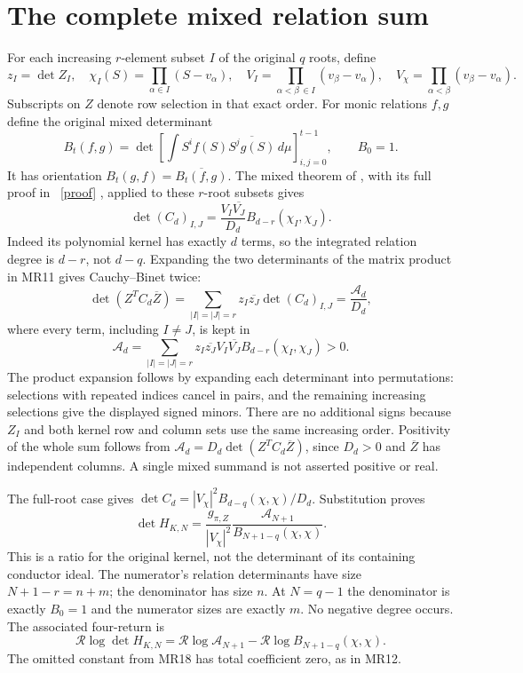 \documentclass[11pt]{article}
\begin{document}
\section{The complete mixed relation sum}
For each increasing $r$-element subset $I$ of the original $q$ roots,
define
\[
 z_I=\det Z_I,\quad
 \chi_I(S)=\prod_{\alpha\in I}(S-v_\alpha),\quad
 V_I=\prod_{\alpha<\beta\,\in I}(v_\beta-v_\alpha),\quad
 V_\chi=\prod_{\alpha<\beta}(v_\beta-v_\alpha).\tag{MR13}
\]
Subscripts on $Z$ denote row selection in that exact order.
For monic relations $f,g$ define the original mixed determinant
\[
 B_t(f,g)=\det\left[\int S^if(S)
                    \overline{S^jg(S)}\,d\mu\right]_{i,j=0}^{t-1},
 \qquad B_0=1.\tag{MR14}
\]
It has orientation $B_t(g,f)=\overline{B_t(f,g)}$.
The mixed theorem of \cite{AV}, with its full proof in \cite{Mixed}%
~\href{https://github.com/KokunoYumeto/zeta-function-research-reader/blob/5992ad50c0f2a06921f1fcaded7b4e38097c0739/workbenches/splitzero-tandem/continuations/20260920-original-kernel-mixed-determinants/MIXED_CONFLUENT_PROOF.tex\#L1}{[proof]}%
{},
applied to these $r$-root subsets gives
\[
 \det(C_d)_{I,J}
  =\frac{V_I\overline{V_J}}{D_d}
           B_{d-r}(\chi_I,\chi_J).\tag{MR15}
\]
Indeed its polynomial kernel has exactly $d$ terms, so the integrated
relation degree is $d-r$, not $d-q$. Expanding the two determinants
of the matrix product in MR11 gives Cauchy--Binet twice:
\[
 \det(Z^TC_d\overline Z)
  =\sum_{|I|=|J|=r}z_I\overline{z_J}\det(C_d)_{I,J}
  =\frac{\mathcal A_d}{D_d},\tag{MR16}
\]
where every term, including $I\ne J$, is kept in
\[
 \mathcal A_d=
 \sum_{|I|=|J|=r}z_I\overline{z_J}V_I\overline{V_J}
                     B_{d-r}(\chi_I,\chi_J)>0.\tag{MR17}
\]
The product expansion follows by expanding each determinant into
permutations: selections with repeated indices cancel in pairs, and
the remaining increasing selections give the displayed signed minors.
There are no additional signs because $Z_I$ and both kernel row and
column sets use the same increasing order.
Positivity of the whole sum follows from
$\mathcal A_d=D_d\det(Z^TC_d\overline Z)$, since $D_d>0$ and
$\overline Z$ has independent columns. A single mixed summand is not
asserted positive or real.

The full-root case gives
$\det C_d=|V_\chi|^2 B_{d-q}(\chi,\chi)/D_d$. Substitution proves
\[
 \boxed{\det H_{K,N}
   =\frac{g_{\pi,Z}}{|V_\chi|^2}
      \frac{\mathcal A_{N+1}}{B_{N+1-q}(\chi,\chi)}.}
 \tag{MR18}
\]
This is a ratio for the original kernel, not the determinant of its
containing conductor ideal. The numerator's relation determinants
have size $N+1-r=n+m$; the denominator has size $n$. At $N=q-1$ the
denominator is exactly $B_0=1$ and the numerator sizes are exactly $m$.
No negative degree occurs. The associated four-return is
\[
 \boxed{\mathcal R\log\det H_{K,N}
   =\mathcal R\log\mathcal A_{N+1}
      -\mathcal R\log B_{N+1-q}(\chi,\chi).}\tag{MR19}
\]
The omitted constant from MR18 has total coefficient zero, as in MR12.
\end{document}
